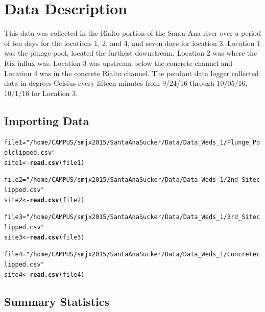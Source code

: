 \documentclass{article}\usepackage[]{graphicx}\usepackage[]{color}
\makeatletter
\newcommand{\hlstr}[1]{\textcolor[rgb]{0.192,0.494,0.8}{#1}}%
\newcommand{\hlstd}[1]{\textcolor[rgb]{0.345,0.345,0.345}{#1}}%
\newcommand{\hlkwb}[1]{\textcolor[rgb]{0.69,0.353,0.396}{#1}}%
\newcommand{\hlkwd}[1]{\textcolor[rgb]{0.737,0.353,0.396}{\textbf{#1}}}%
\newenvironment{kframe}{%
 \def\at@end@of@kframe{}%
 \ifinner\ifhmode%
  \def\at@end@of@kframe{\end{minipage}}%
  \begin{minipage}{\columnwidth}%
 \fi\fi%
 \def\FrameCommand##1{\hskip\@totalleftmargin \hskip-\fboxsep
 \colorbox{shadecolor}{##1}\hskip-\fboxsep
     \hskip-\linewidth \hskip-\@totalleftmargin \hskip\columnwidth}%
 \MakeFramed {\advance\hsize-\width
   \@totalleftmargin\z@ \linewidth\hsize
   \@setminipage}}%
 {\par\unskip\endMakeFramed%
 \at@end@of@kframe}
\newenvironment{knitrout}{}{} %
\makeatother
\begin{document}

\section{Data Description}

This data was collected in the Rialto portion of the Santa Ana river over a period of ten days for the locations 1, 2, and 4, and seven days for location 3. Location 1 was the plunge pool, located the furthest downstream. Location 2 was where the Rix influx was. Location 3 was upstream below the concrete channel and Location 4 was in the concrete Rialto channel. The pendant data logger collected data in degrees Celsius every fifteen minutes from 9/24/16 through 10/05/16, 10/1/16 for Location 3. 


\subsection{Importing Data}


\begin{knitrout}
\color{fgcolor}\begin{kframe}
\begin{alltt}
\hlstd{file1} \hlkwb{=} \hlstr{"/home/CAMPUS/smjx2015/Santa Ana Sucker/Data/Data_Weds_1/Plunge_Pool clipped.csv"}
\hlstd{site1} \hlkwb{<-} \hlkwd{read.csv}\hlstd{(file1)}

\hlstd{file2} \hlkwb{=} \hlstr{"/home/CAMPUS/smjx2015/Santa Ana Sucker/Data/Data_Weds_1/2nd_Site clipped.csv"}
\hlstd{site2} \hlkwb{<-} \hlkwd{read.csv}\hlstd{(file2)}

\hlstd{file3} \hlkwb{=} \hlstr{"/home/CAMPUS/smjx2015/Santa Ana Sucker/Data/Data_Weds_1/3rd_Site clipped.csv"}
\hlstd{site3} \hlkwb{<-} \hlkwd{read.csv}\hlstd{(file3)}

\hlstd{file4} \hlkwb{=} \hlstr{"/home/CAMPUS/smjx2015/Santa Ana Sucker/Data/Data_Weds_1/Concrete clipped.csv"}
\hlstd{site4} \hlkwb{<-} \hlkwd{read.csv}\hlstd{(file4)}
\end{alltt}
\end{kframe}
\end{knitrout}


\subsection{Summary Statistics}
\end{document}
